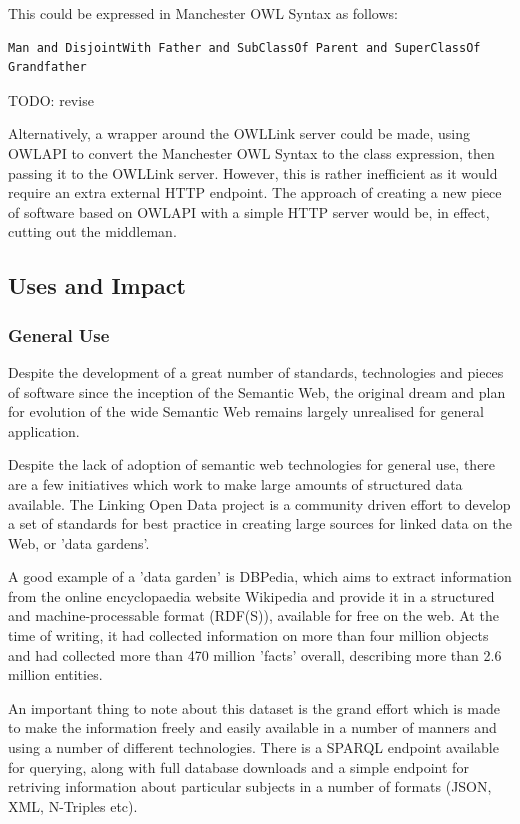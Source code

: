 \documentclass{article}
\begin{document}
This could be expressed in Manchester OWL Syntax as follows:

\begin{lstlisting}
Man and DisjointWith Father and SubClassOf Parent and SuperClassOf Grandfather
\end{lstlisting}

TODO: revise

Alternatively, a wrapper around the OWLLink server could be made, using OWLAPI
to convert the Manchester OWL Syntax to the class expression, then passing it to
the OWLLink server. However, this is rather inefficient as it would require an
extra external HTTP endpoint. The approach of creating a new piece of software 
based on OWLAPI with a simple HTTP server would be, in effect, cutting out the 
middleman.

\subsection{Uses and Impact}

\subsubsection{General Use}

Despite the development of a great number of standards, technologies and pieces
of software since the inception of the Semantic Web, the original
dream and plan for evolution of the wide Semantic Web remains largely unrealised
for general application.\cite{semweb}

Despite the lack of adoption of semantic web technologies for general use, there
are a few initiatives which work to make large amounts of structured data
available. The Linking Open Data project is a community driven effort to develop
a set of standards for best practice in creating large sources for linked data
on the Web, or 'data gardens'.

A good example of a 'data garden' is DBPedia, which aims to extract
information from the online encyclopaedia website Wikipedia and provide it in a
structured and machine-processable format (RDF(S)), available for free on the 
web.\cite{dbpedia} At the time of writing, it had collected information on more than four 
million objects and had collected more than 470 million 'facts' overall,
describing more than 2.6 million entities.\cite{dbpediastats}

An important thing to note about this dataset is the grand effort which is made
to make the information freely and easily available in a number of manners and
using a number of different technologies. There is a SPARQL endpoint available
for querying, along with full database downloads and a simple endpoint for
retriving information about particular subjects in a number of formats (JSON,
XML, N-Triples etc).
\end{document}
